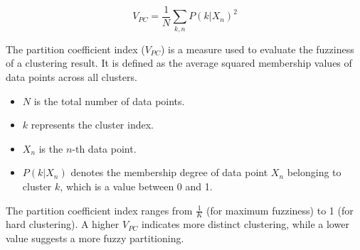 \documentclass[12pt,letterpaper]{article}
\begin{document}
\begin{itemize}
    \[
    V_{PC} = \frac{1}{N} \sum_{k,n} P(k|X_n)^2
    \]

    \noindent The partition coefficient index (\(V_{PC}\)) is a measure used to evaluate the fuzziness of a clustering result. It is defined as the average squared membership values of data points across all clusters. 

    \begin{itemize}
        \item \( N \) is the total number of data points.
        \item \( k \) represents the cluster index.
        \item \( X_n \) is the \( n \)-th data point.
        \item \( P(k|X_n) \) denotes the membership degree of data point \( X_n \) belonging to cluster \( k \), which is a value between 0 and 1.
    \end{itemize}

    \noindent The partition coefficient index ranges from \( \frac{1}{K} \) (for maximum fuzziness) to 1 (for hard clustering). A higher \(V_{PC}\) indicates more distinct clustering, while a lower value suggests a more fuzzy partitioning.

    \end{itemize}
\end{document}
